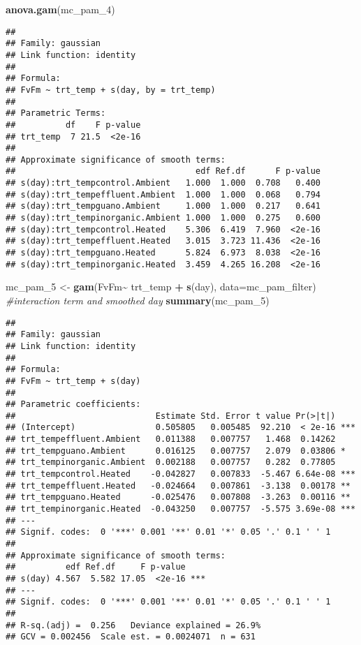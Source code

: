 \documentclass[
]{article}
\newenvironment{Shaded}{\begin{snugshade}}{\end{snugshade}}
\newcommand{\AttributeTok}[1]{\textcolor[rgb]{0.13,0.29,0.53}{#1}}
\newcommand{\CommentTok}[1]{\textcolor[rgb]{0.56,0.35,0.01}{\textit{#1}}}
\newcommand{\FunctionTok}[1]{\textcolor[rgb]{0.13,0.29,0.53}{\textbf{#1}}}
\newcommand{\NormalTok}[1]{#1}
\newcommand{\OtherTok}[1]{\textcolor[rgb]{0.56,0.35,0.01}{#1}}
\newcommand{\SpecialCharTok}[1]{\textcolor[rgb]{0.81,0.36,0.00}{\textbf{#1}}}
\begin{document}
\begin{Shaded}
\begin{Highlighting}[]
\FunctionTok{anova.gam}\NormalTok{(mc\_pam\_4)}
\end{Highlighting}
\end{Shaded}

\begin{verbatim}
## 
## Family: gaussian 
## Link function: identity 
## 
## Formula:
## FvFm ~ trt_temp + s(day, by = trt_temp)
## 
## Parametric Terms:
##          df    F p-value
## trt_temp  7 21.5  <2e-16
## 
## Approximate significance of smooth terms:
##                                    edf Ref.df      F p-value
## s(day):trt_tempcontrol.Ambient   1.000  1.000  0.708   0.400
## s(day):trt_tempeffluent.Ambient  1.000  1.000  0.068   0.794
## s(day):trt_tempguano.Ambient     1.000  1.000  0.217   0.641
## s(day):trt_tempinorganic.Ambient 1.000  1.000  0.275   0.600
## s(day):trt_tempcontrol.Heated    5.306  6.419  7.960  <2e-16
## s(day):trt_tempeffluent.Heated   3.015  3.723 11.436  <2e-16
## s(day):trt_tempguano.Heated      5.824  6.973  8.038  <2e-16
## s(day):trt_tempinorganic.Heated  3.459  4.265 16.208  <2e-16
\end{verbatim}

\begin{Shaded}
\begin{Highlighting}[]
\NormalTok{mc\_pam\_5 }\OtherTok{\textless{}{-}} \FunctionTok{gam}\NormalTok{(FvFm}\SpecialCharTok{\textasciitilde{}}\NormalTok{ trt\_temp }\SpecialCharTok{+} \FunctionTok{s}\NormalTok{(day), }\AttributeTok{data=}\NormalTok{mc\_pam\_filter) }\CommentTok{\#interaction term and smoothed day}
\FunctionTok{summary}\NormalTok{(mc\_pam\_5)}
\end{Highlighting}
\end{Shaded}

\begin{verbatim}
## 
## Family: gaussian 
## Link function: identity 
## 
## Formula:
## FvFm ~ trt_temp + s(day)
## 
## Parametric coefficients:
##                            Estimate Std. Error t value Pr(>|t|)    
## (Intercept)                0.505805   0.005485  92.210  < 2e-16 ***
## trt_tempeffluent.Ambient   0.011388   0.007757   1.468  0.14262    
## trt_tempguano.Ambient      0.016125   0.007757   2.079  0.03806 *  
## trt_tempinorganic.Ambient  0.002188   0.007757   0.282  0.77805    
## trt_tempcontrol.Heated    -0.042827   0.007833  -5.467 6.64e-08 ***
## trt_tempeffluent.Heated   -0.024664   0.007861  -3.138  0.00178 ** 
## trt_tempguano.Heated      -0.025476   0.007808  -3.263  0.00116 ** 
## trt_tempinorganic.Heated  -0.043250   0.007757  -5.575 3.69e-08 ***
## ---
## Signif. codes:  0 '***' 0.001 '**' 0.01 '*' 0.05 '.' 0.1 ' ' 1
## 
## Approximate significance of smooth terms:
##          edf Ref.df     F p-value    
## s(day) 4.567  5.582 17.05  <2e-16 ***
## ---
## Signif. codes:  0 '***' 0.001 '**' 0.01 '*' 0.05 '.' 0.1 ' ' 1
## 
## R-sq.(adj) =  0.256   Deviance explained = 26.9%
## GCV = 0.002456  Scale est. = 0.0024071  n = 631
\end{verbatim}
\end{document}
